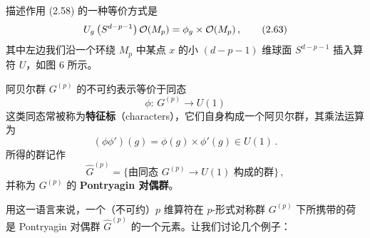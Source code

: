  描述作用 (2.58) 的一种等价方式是
\begin{equation}
  U_g\left(S^{d-p-1}\right)\mathcal{O}(M_p) = \phi_g\times\mathcal{O}(M_p)\,, \tag{2.63}
\end{equation}
其中左边我们沿一个环绕 $M_p$ 中某点 $x$ 的小 $(d-p-1)$ 维球面 $S^{d-p-1}$ 插入算符 $U$，如图 6 所示。


 阿贝尔群 $G^{(p)}$ 的不可约表示等价于同态
\begin{equation}
  \phi:\,G^{(p)}\to U(1) \tag{2.64}
\end{equation}
这类同态常被称为\textbf{特征标}（characters），它们自身构成一个阿贝尔群，其乘法运算为
\begin{equation}
  (\phi\phi')(g) = \phi(g)\times\phi'(g)\in U(1)\,. \tag{2.65}
\end{equation}
所得的群记作
\begin{equation}
  \widehat{G}^{(p)} = \{\text{由同态 } G^{(p)}\to U(1) \text{ 构成的群}\}\,, \tag{2.66}
\end{equation}
并称为 $G^{(p)}$ 的 \textbf{Pontryagin 对偶群}。

用这一语言来说，一个（不可约）$p$ 维算符在 $p$-形式对称群 $G^{(p)}$ 下所携带的荷是 Pontryagin 对偶群 $\widehat{G}^{(p)}$ 的一个元素。让我们讨论几个例子：

